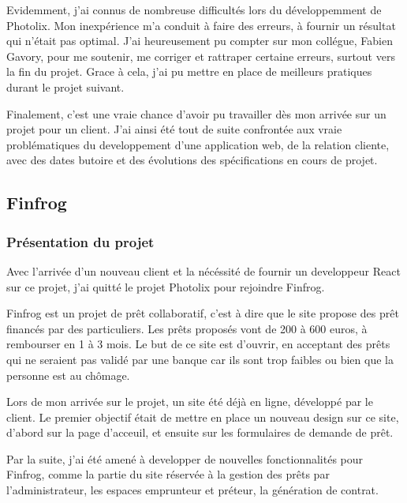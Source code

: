 \bigskip

Evidemment, j'ai connus de nombreuse difficultés lors du développemment
de Photolix. Mon inexpérience m'a conduit à faire des erreurs, à fournir
un résultat qui n'était pas optimal. J'ai heureusement pu compter sur
mon collégue, Fabien Gavory, pour me soutenir, me corriger et rattraper
certaine erreurs, surtout vers la fin du projet. Grace à cela, j'ai pu
mettre en place de meilleurs pratiques durant le projet suivant.

\bigskip

Finalement, c'est une vraie chance d'avoir pu travailler dès mon arrivée
sur un projet pour un client. J'ai ainsi été tout de suite confrontée
aux vraie problématiques du developpement d'une application web, de la
relation cliente, avec des dates butoire et des évolutions des
spécifications en cours de projet.

\subsection{Finfrog}\label{finfrog}

\subsubsection{Présentation du
projet}\label{pruxe9sentation-du-projet-1}

\bigskip

Avec l'arrivée d'un nouveau client et la nécéssité de fournir un
developpeur React sur ce projet, j'ai quitté le projet Photolix pour
rejoindre Finfrog.

\bigskip

Finfrog est un projet de prêt collaboratif, c'est à dire que le site
propose des prêt financés par des particuliers. Les prêts proposés vont
de 200 à 600 euros, à rembourser en 1 à 3 mois. Le but de ce site est
d'ouvrir, en acceptant des prêts qui ne seraient pas validé par une
banque car ils sont trop faibles ou bien que la personne est au chômage.

\bigskip

Lors de mon arrivée sur le projet, un site été déjà en ligne, développé
par le client. Le premier objectif était de mettre en place un nouveau
design sur ce site, d'abord sur la page d'acceuil, et ensuite sur les
formulaires de demande de prêt.

\bigskip

Par la suite, j'ai été amené à developper de nouvelles fonctionnalités
pour Finfrog, comme la partie du site réservée à la gestion des prêts
par l'administrateur, les espaces emprunteur et préteur, la génération
de contrat.

